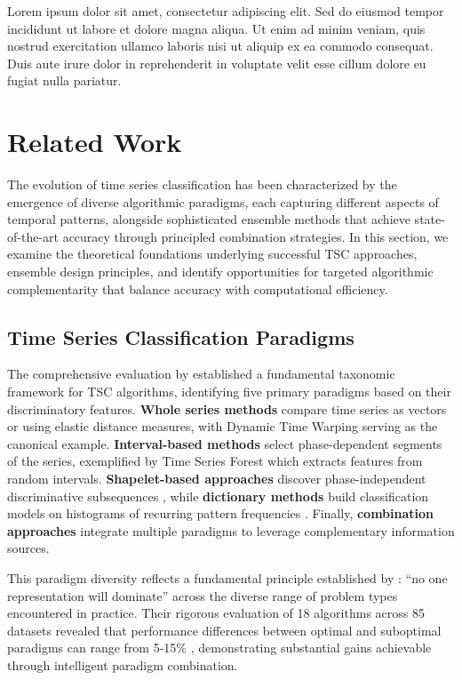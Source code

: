 \documentclass[pdflatex,sn-basic]{sn-jnl}           %
\theoremstyle{thmstyleone}%
\theoremstyle{thmstyletwo}%
\theoremstyle{thmstylethree}%
\begin{document}
Lorem ipsum dolor sit amet, consectetur adipiscing elit. Sed do eiusmod tempor incididunt ut labore et dolore magna aliqua. Ut enim ad minim veniam, quis nostrud exercitation ullamco laboris nisi ut aliquip ex ea commodo consequat. Duis aute irure dolor in reprehenderit in voluptate velit esse cillum dolore eu fugiat nulla pariatur.

\section{Related Work}\label{sec2}

The evolution of time series classification has been characterized by the emergence of diverse algorithmic paradigms, each capturing different aspects of temporal patterns, alongside sophisticated ensemble methods that achieve state-of-the-art accuracy through principled combination strategies. In this section, we examine the theoretical foundations underlying successful TSC approaches, ensemble design principles, and identify opportunities for targeted algorithmic complementarity that balance accuracy with computational efficiency.

\subsection{Time Series Classification Paradigms}

The comprehensive evaluation by \citet[p.~610]{tsc-bakeoff} established a fundamental taxonomic framework for TSC algorithms, identifying five primary paradigms based on their discriminatory features. \textbf{Whole series methods} compare time series as vectors or using elastic distance measures, with Dynamic Time Warping serving as the canonical example. \textbf{Interval-based methods} select phase-dependent segments of the series, exemplified by Time Series Forest \cite{deng-2013} which extracts features from random intervals. \textbf{Shapelet-based approaches} discover phase-independent discriminative subsequences \cite{time_series_shapelets}, while \textbf{dictionary methods} build classification models on histograms of recurring pattern frequencies \cite{schaefer-2015}. Finally, \textbf{combination approaches} integrate multiple paradigms to leverage complementary information sources.

This paradigm diversity reflects a fundamental principle established by \citet[p.~637]{tsc-bakeoff}: ``no one representation will dominate'' across the diverse range of problem types encountered in practice. Their rigorous evaluation of 18 algorithms across 85 datasets revealed that performance differences between optimal and suboptimal paradigms can range from 5-15\% \citep[p.~647, Table~11]{tsc-bakeoff}, demonstrating substantial gains achievable through intelligent paradigm combination.
\end{document}
